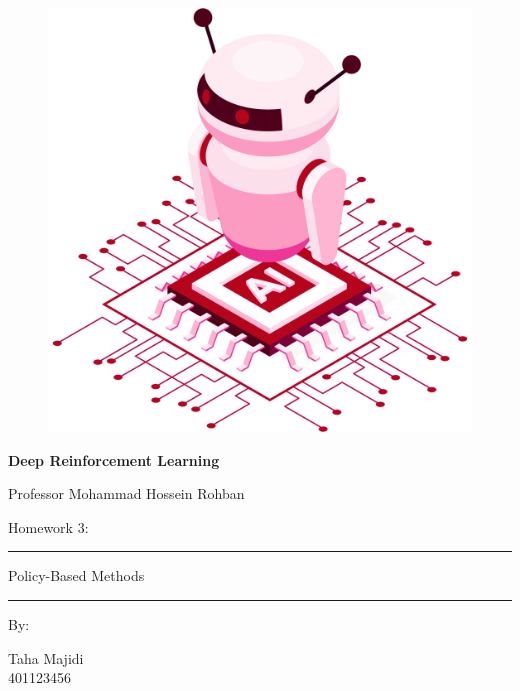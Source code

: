 \documentclass[12pt]{article}
\begin{document}
\thispagestyle{plain}

\begin{center}

\vspace*{-1.5cm}
\begin{figure}[!h]
    \centering
    \includegraphics[width=0.7\linewidth]{figs/cover-std.png}
\end{figure}

{

{\color{DarkBlue} {\fontsize{30}{50} \textbf{
Deep Reinforcement Learning
}}}

{\color{DarkBlue} {\Large
Professor Mohammad Hossein Rohban
}}
}


\vspace{20pt}

{


{\color{RedOrange}
{\Large
Homework 3:
}\\
}
{\color{BrickRed}
\rule{12cm}{0.5pt}

{\Huge
Policy-Based Methods
}
\rule{12cm}{0.5pt}
}

\vspace{10pt}

{\color{RoyalPurple} { \small By:} } \\
\vspace{10pt}

{\color{Blue} { \LARGE Taha Majidi } } \\
\vspace{5pt}
{\color{RoyalBlue} { \Large 401123456 } }


}
\end{center}
\end{document}
